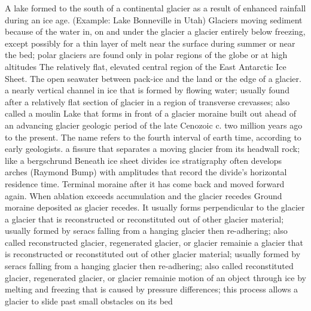  A lake formed to the south of a continental glacier as a result of enhanced rainfall during an ice age. (Example: Lake Bonneville in Utah)
 Glaciers moving sediment because of the water in, on and under the glacier
 a glacier entirely below freezing, except possibly for a thin layer of melt near the surface during summer or near the bed; polar glaciers are found only in polar regions of the globe or at high altitudes
 The relatively flat, elevated central region of the East Antarctic Ice Sheet.
 The open seawater between pack-ice and the land or the edge of a glacier.
 a nearly vertical channel in ice that is formed by flowing water; usually found after a relatively flat section of glacier in a region of transverse crevasses; also called a moulin
 Lake that forms in front of a glacier
 moraine built out ahead of an advancing glacier
 geologic period of the late Cenozoic c. two million years ago to the present. The name refers to the fourth interval of earth time, according to early geologists.
 a fissure that separates a moving glacier from its headwall rock; like a bergschrund
 Beneath ice sheet divides ice stratigraphy often develops arches (Raymond Bump) with amplitudes that record the divide's horizontal residence time.
 Terminal moraine after it has come back and moved forward again.
 When ablation exceeds accumulation and the glacier recedes
 Ground moraine deposited as glacier recedes. It usually forms perpendicular to the glacier
 a glacier that is reconstructed or reconstituted out of other glacier material; usually formed by seracs falling from a hanging glacier then re-adhering; also called reconstructed glacier, regenerated glacier, or glacier remainie
 a glacier that is reconstructed or reconstituted out of other glacier material; usually formed by seracs falling from a hanging glacier then re-adhering; also called reconstituted glacier, regenerated glacier, or glacier remainie
 motion of an object through ice by melting and freezing that is caused by pressure differences; this process allows a glacier to slide past small obstacles on its bed
